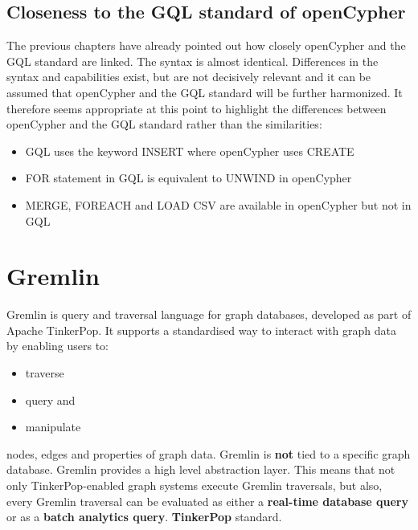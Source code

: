 \subsection{Closeness to the GQL standard of openCypher}
The previous chapters have already pointed out how closely openCypher 
and the GQL standard are linked. 
The syntax is almost identical. 
Differences in the syntax and capabilities exist, 
but are not decisively relevant and it can be assumed that openCypher 
and the GQL standard will be further harmonized. 
It therefore seems appropriate at this point to highlight the differences 
between openCypher and the GQL standard rather than the similarities:

\begin{itemize}
	\item GQL uses the keyword INSERT where openCypher uses CREATE
	\item FOR statement in GQL is equivalent to UNWIND in openCypher
	\item MERGE, FOREACH and LOAD CSV are available in openCypher but not in GQL
\end{itemize}


\section{Gremlin}
Gremlin is query and traversal language for graph databases, developed as part of Apache TinkerPop.
It supports a standardised way to interact with graph data by enabling users to:
\begin{itemize}
	\item traverse
	\item query and
	\item manipulate
\end{itemize}
nodes, edges and properties of graph data. Gremlin is \textbf{not} tied to a specific graph database.
Gremlin provides a high level abstraction layer.
This means that not only TinkerPop-enabled graph systems execute Gremlin traversals, 
but also, every Gremlin traversal can be evaluated as either a \textbf{real-time database query}
or as a \textbf{batch analytics query}. 
\textbf{TinkerPop} standard.
